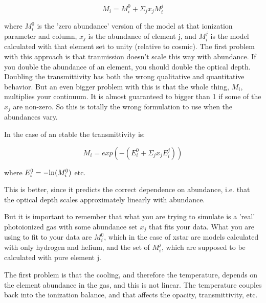 \begin{equation}
M_i=M_i^0+\Sigma_j x_j M_i^j
\end{equation}

where $M_i^0$ is the 'zero abundance' version of the model at that 
ionization parameter and column, $x_j$ is the abundance of element j, 
and $M_i^j$ is the model calculated with that element set to unity (relative 
to cosmic).  The first problem with this approach is that tranmission 
doesn't  scale this way with abundance. If you double the abundance 
of an element, you should double the optical depth.  Doubling the 
transmittivity has both the wrong qualitative and quantitative behavior.
But an even bigger problem with this is that the whole thing, $M_i$, 
multiplies your continuum.  It is almost guaranteed to bigger than 1 if 
some of the $x_j$ are non-zero.  So this is totally the wrong formulation to 
use when the abundances vary.  


In the case of an etable the transmittivity is:

\begin{equation}
M_i=exp(-(E_i^0+\Sigma_j x_j E_i^j))
\end{equation}

where $E_i^0=-{\rm ln}(M_i^0)$ etc.

This is better, since it predicts the correct dependence on abundance,
i.e. that the optical depth scales approximately linearly with 
abundance.

But it is important to remember that what you are trying 
to simulate is a 'real' photoionized gas with some abundance set {$x_j$} 
that fits your data.  What you are using to fit to your data are $M_i^0$, 
which in the case of xstar are models calculated with only hydrogen and 
helium, and the set of $M_i^j$, which are supposed to be calculated with 
pure element j.  

The first  problem is that the cooling, and therefore the 
temperature, depends on the element abundance in the gas, and this is not 
linear.  The temperature couples back into the ionization balance, and 
that affects the opacity, transmittivity, etc. 

